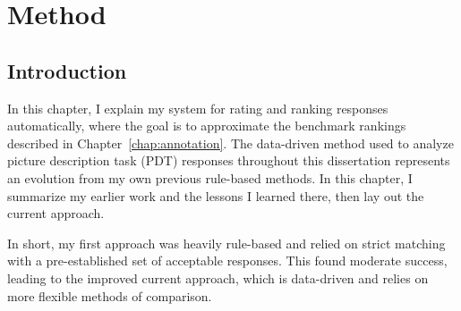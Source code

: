 \chapter{Method}
\label{chap:method}
%
%
%
%
%
%
%
%
%
%
%
%
\section{Introduction}
In this chapter, I explain my system for rating and ranking responses automatically, where the goal is to approximate the benchmark rankings described in Chapter~\ref{chap:annotation}. 
The data-driven method used to analyze picture description task (PDT) responses throughout this dissertation represents an evolution from my own previous rule-based methods. In this chapter, I summarize my earlier work and the lessons I learned there, then lay out the current approach.

In short, my first approach was heavily rule-based and relied on strict matching with a pre-established set of acceptable responses. This found moderate success, leading to the improved current approach, which is data-driven and relies on more flexible methods of comparison. 


